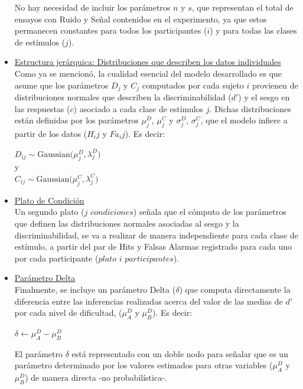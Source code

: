 \begin{itemize}
No hay necesidad de incluir los parámetros $n$ y $s$, que representan el total de ensayos con Ruido y Señal contenidos en el experimento, ya que estos permanecen constantes para todos los participantes ($i$) y para todas las clases de estímulos ($j$).\\

\item \underline{Estructura jerárquica: Distribuciones que describen los datos individuales}\\

Como ya se mencionó, la cualidad esencial del modelo desarrollado es que asume que los parámetros $D_{j}$ y $C_{j}$ computados por cada sujeto $i$ provienen de distribuciones normales que describen la discriminabilidad ($d'$) y el sesgo en las respuestas ($c$) asociado a cada clase de estímulos $j$. Dichas distribuciones están definidas por los parámetros $\mu^D_{j}$, $\mu^C_{j}$ y $\sigma^D_{j}$, $\sigma^C_{j}$, que el modelo infiere a partir de los datos ($H_ij$ y $Fa_ij$). Es decir:\\

\begin{center}
$D_{ij}\sim \mathrm{Gaussian}\bigl(\mu^D_{j},\lambda^D_{j})$\\
y\\
$C_{ij}\sim \mathrm{Gaussian}\bigl(\mu^C_{j},\lambda^C_{j})$\\
\end{center}

\item \underline{Plato de Condición}\\

Un segundo plato ($j$ $condiciones$) señala que el cómputo de los parámetros que definen las distribuciones normales asociadas al sesgo y la discriminabilidad, se va a realizar de manera independiente para cada clase de estímulo, a partir del par de Hits y Falsas Alarmas registrado para cada uno por cada participante ($plato$ $i$ $participantes$).\\

\item \underline{Parámetro Delta}\\

Finalmente, se incluye un parámetro Delta ($\delta$) que computa directamente la diferencia entre las inferencias realizadas acerca del valor de las medias de $d'$ por cada nivel de dificultad, ($\mu^D_{A}$ y $\mu^D_{B}$). Es decir:\\

\begin{center}
$\delta \gets \mu^D_{A}-\mu^D_{B}$\\
\end{center}

El parámetro $\delta$ está representado con un doble nodo para señalar que es un parámetro determinado por los valores estimados para otras variables ($\mu^D_{A}$ y $\mu^D_{B}$) de manera directa -no probabilística-.\\
\end{itemize} 

